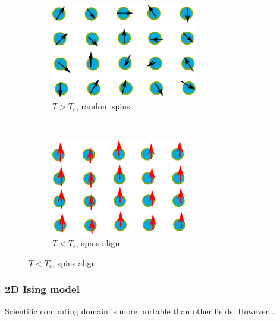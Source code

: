 \documentclass[notheorems]{beamer}
\begin{document}
\begin{frame}
\begin{columns}
	\end{columns}
\begin{figure}
	\centering
	\begin{subfigure}{0.4\textwidth}
		\includegraphics[width=0.7\textwidth]{Tlarge.pdf}
		\caption{$T>T_c$, random spins}
	\end{subfigure}~
	\begin{subfigure}{0.4\textwidth}
		\includegraphics[width=0.65\textwidth]{Tsmall.pdf}
		\caption{$T<T_c$, spins align}
	\end{subfigure}
\end{figure}
\end{frame}
\begin{frame}
\frametitle{2D Ising model}
\begin{figure}
\end{figure}
Scientific computing domain is more portable than other fields. However...
\end{frame}
\end{document}

